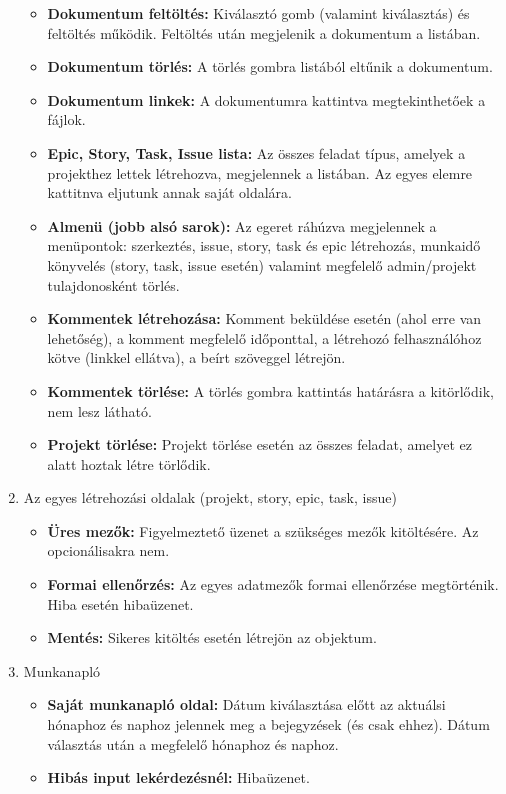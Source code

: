\begin{enumerate}
\begin{itemize}
		\item \textbf{Dokumentum feltöltés:} Kiválasztó gomb (valamint kiválasztás) és feltöltés működik. Feltöltés után megjelenik a dokumentum a listában.
		\item \textbf{Dokumentum törlés:} A törlés gombra listából eltűnik a dokumentum.
		\item \textbf{Dokumentum linkek:} A dokumentumra kattintva megtekinthetőek a fájlok.
		\item \textbf{Epic, Story, Task, Issue lista:} Az összes feladat típus, amelyek a projekthez lettek létrehozva, megjelennek a listában. Az egyes elemre kattitnva eljutunk annak saját oldalára.
		\item \textbf{Almenü (jobb alsó sarok):} Az egeret ráhúzva megjelennek a menüpontok: szerkeztés, issue, story, task és epic létrehozás, munkaidő könyvelés (story, task, issue esetén) valamint megfelelő admin/projekt tulajdonosként törlés.
		\item \textbf{Kommentek létrehozása:} Komment beküldése esetén (ahol erre van lehetőség), a komment megfelelő időponttal, a létrehozó felhasználóhoz kötve (linkkel ellátva), a beírt szöveggel létrejön.
		\item \textbf{Kommentek törlése:} A törlés gombra kattintás határásra a kitörlődik, nem lesz látható.
		\item \textbf{Projekt törlése:} Projekt törlése esetén az összes feladat, amelyet ez alatt hoztak létre törlődik.
	\end{itemize} 
	\item Az egyes létrehozási oldalak (projekt, story, epic, task, issue)
	\begin{itemize}
		\item \textbf{Üres mezők:} Figyelmeztető üzenet a szükséges mezők kitöltésére. Az opcionálisakra nem.
		\item \textbf{Formai ellenőrzés:} Az egyes adatmezők formai ellenőrzése megtörténik. Hiba esetén hibaüzenet.
		\item \textbf{Mentés:} Sikeres kitöltés esetén létrejön az objektum.
	\end{itemize}
	\item Munkanapló
	\begin{itemize}
		\item \textbf{Saját munkanapló oldal:} Dátum kiválasztása előtt az aktuálsi hónaphoz és naphoz jelennek meg a bejegyzések (és csak ehhez). Dátum választás után a megfelelő hónaphoz és naphoz.
		\item \textbf{Hibás input lekérdezésnél:}  Hibaüzenet.

\end{itemize}
\end{enumerate}
